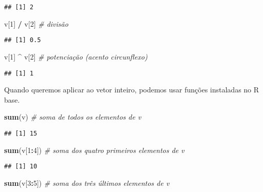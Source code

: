 \documentclass[
]{book}
\newenvironment{Shaded}{\begin{snugshade}}{\end{snugshade}}
\newcommand{\CommentTok}[1]{\textcolor[rgb]{0.56,0.35,0.01}{\textit{#1}}}
\newcommand{\DecValTok}[1]{\textcolor[rgb]{0.00,0.00,0.81}{#1}}
\newcommand{\KeywordTok}[1]{\textcolor[rgb]{0.13,0.29,0.53}{\textbf{#1}}}
\newcommand{\NormalTok}[1]{#1}
\newcommand{\OperatorTok}[1]{\textcolor[rgb]{0.81,0.36,0.00}{\textbf{#1}}}
\newcommand{\StringTok}[1]{\textcolor[rgb]{0.31,0.60,0.02}{#1}}
\begin{document}
\begin{verbatim}
## [1] 2
\end{verbatim}

\begin{Shaded}
\begin{Highlighting}[]
\NormalTok{v[}\DecValTok{1}\NormalTok{] }\OperatorTok{/}\StringTok{ }\NormalTok{v[}\DecValTok{2}\NormalTok{] }\CommentTok{# divisão}
\end{Highlighting}
\end{Shaded}

\begin{verbatim}
## [1] 0.5
\end{verbatim}

\begin{Shaded}
\begin{Highlighting}[]
\NormalTok{v[}\DecValTok{1}\NormalTok{] }\OperatorTok{^}\StringTok{ }\NormalTok{v[}\DecValTok{2}\NormalTok{] }\CommentTok{# potenciação (acento circunflexo)}
\end{Highlighting}
\end{Shaded}

\begin{verbatim}
## [1] 1
\end{verbatim}

Quando queremos aplicar ao vetor inteiro, podemos usar funções instaladas no R base.

\begin{Shaded}
\begin{Highlighting}[]
\KeywordTok{sum}\NormalTok{(v) }\CommentTok{# soma de todos os elementos de v}
\end{Highlighting}
\end{Shaded}

\begin{verbatim}
## [1] 15
\end{verbatim}

\begin{Shaded}
\begin{Highlighting}[]
\KeywordTok{sum}\NormalTok{(v[}\DecValTok{1}\OperatorTok{:}\DecValTok{4}\NormalTok{]) }\CommentTok{# soma dos quatro primeiros elementos de v}
\end{Highlighting}
\end{Shaded}

\begin{verbatim}
## [1] 10
\end{verbatim}

\begin{Shaded}
\begin{Highlighting}[]
\KeywordTok{sum}\NormalTok{(v[}\DecValTok{3}\OperatorTok{:}\DecValTok{5}\NormalTok{]) }\CommentTok{# soma dos três últimos elementos de v}
\end{Highlighting}
\end{Shaded}
\end{document}
